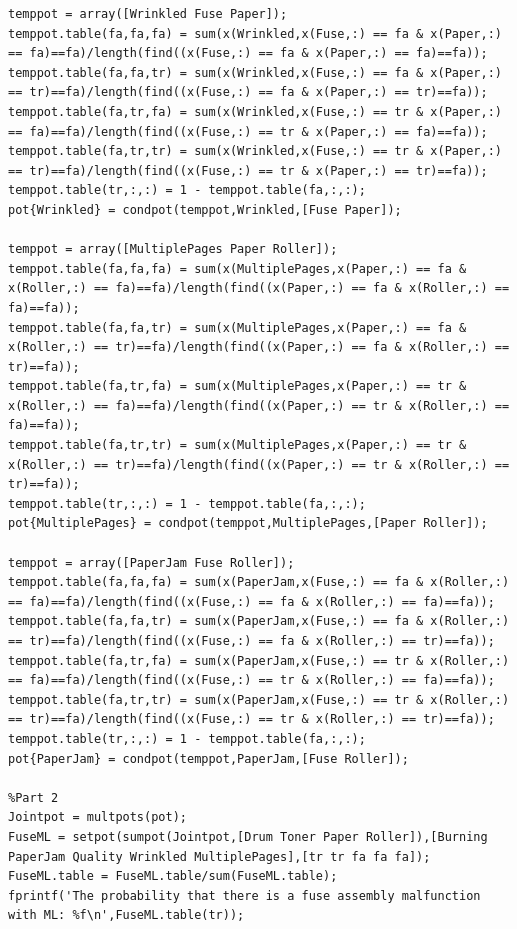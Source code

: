 \documentclass[11pt,a4paper,oneside]{report}
\begin{document}
\begin{lstlisting}
temppot = array([Wrinkled Fuse Paper]);
temppot.table(fa,fa,fa) = sum(x(Wrinkled,x(Fuse,:) == fa & x(Paper,:) == fa)==fa)/length(find((x(Fuse,:) == fa & x(Paper,:) == fa)==fa));
temppot.table(fa,fa,tr) = sum(x(Wrinkled,x(Fuse,:) == fa & x(Paper,:) == tr)==fa)/length(find((x(Fuse,:) == fa & x(Paper,:) == tr)==fa));
temppot.table(fa,tr,fa) = sum(x(Wrinkled,x(Fuse,:) == tr & x(Paper,:) == fa)==fa)/length(find((x(Fuse,:) == tr & x(Paper,:) == fa)==fa));
temppot.table(fa,tr,tr) = sum(x(Wrinkled,x(Fuse,:) == tr & x(Paper,:) == tr)==fa)/length(find((x(Fuse,:) == tr & x(Paper,:) == tr)==fa));
temppot.table(tr,:,:) = 1 - temppot.table(fa,:,:);
pot{Wrinkled} = condpot(temppot,Wrinkled,[Fuse Paper]);

temppot = array([MultiplePages Paper Roller]);
temppot.table(fa,fa,fa) = sum(x(MultiplePages,x(Paper,:) == fa & x(Roller,:) == fa)==fa)/length(find((x(Paper,:) == fa & x(Roller,:) == fa)==fa));
temppot.table(fa,fa,tr) = sum(x(MultiplePages,x(Paper,:) == fa & x(Roller,:) == tr)==fa)/length(find((x(Paper,:) == fa & x(Roller,:) == tr)==fa));
temppot.table(fa,tr,fa) = sum(x(MultiplePages,x(Paper,:) == tr & x(Roller,:) == fa)==fa)/length(find((x(Paper,:) == tr & x(Roller,:) == fa)==fa));
temppot.table(fa,tr,tr) = sum(x(MultiplePages,x(Paper,:) == tr & x(Roller,:) == tr)==fa)/length(find((x(Paper,:) == tr & x(Roller,:) == tr)==fa));
temppot.table(tr,:,:) = 1 - temppot.table(fa,:,:);
pot{MultiplePages} = condpot(temppot,MultiplePages,[Paper Roller]);

temppot = array([PaperJam Fuse Roller]);
temppot.table(fa,fa,fa) = sum(x(PaperJam,x(Fuse,:) == fa & x(Roller,:) == fa)==fa)/length(find((x(Fuse,:) == fa & x(Roller,:) == fa)==fa));
temppot.table(fa,fa,tr) = sum(x(PaperJam,x(Fuse,:) == fa & x(Roller,:) == tr)==fa)/length(find((x(Fuse,:) == fa & x(Roller,:) == tr)==fa));
temppot.table(fa,tr,fa) = sum(x(PaperJam,x(Fuse,:) == tr & x(Roller,:) == fa)==fa)/length(find((x(Fuse,:) == tr & x(Roller,:) == fa)==fa));
temppot.table(fa,tr,tr) = sum(x(PaperJam,x(Fuse,:) == tr & x(Roller,:) == tr)==fa)/length(find((x(Fuse,:) == tr & x(Roller,:) == tr)==fa));
temppot.table(tr,:,:) = 1 - temppot.table(fa,:,:);
pot{PaperJam} = condpot(temppot,PaperJam,[Fuse Roller]);

%Part 2
Jointpot = multpots(pot);
FuseML = setpot(sumpot(Jointpot,[Drum Toner Paper Roller]),[Burning PaperJam Quality Wrinkled MultiplePages],[tr tr fa fa fa]);
FuseML.table = FuseML.table/sum(FuseML.table);
fprintf('The probability that there is a fuse assembly malfunction with ML: %f\n',FuseML.table(tr));


\end{lstlisting}
\end{document}

